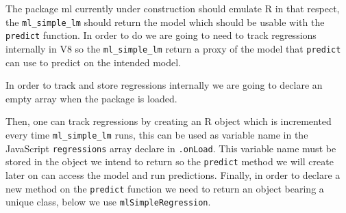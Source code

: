 \documentclass[
]{krantz}
\makeatletter
\newenvironment{Shaded}{\begin{snugshade}}{\end{snugshade}}
\newcommand{\CommentTok}[1]{\textcolor[rgb]{0.37,0.37,0.37}{\textit{#1}}}
\newcommand{\ControlFlowTok}[1]{\textcolor[rgb]{0.27,0.27,0.27}{\textbf{#1}}}
\newcommand{\DataTypeTok}[1]{\textcolor[rgb]{0.27,0.27,0.27}{#1}}
\newcommand{\KeywordTok}[1]{\textcolor[rgb]{0.27,0.27,0.27}{\textbf{#1}}}
\newcommand{\NormalTok}[1]{#1}
\newcommand{\OperatorTok}[1]{\textcolor[rgb]{0.43,0.43,0.43}{\textbf{#1}}}
\newcommand{\OtherTok}[1]{\textcolor[rgb]{0.37,0.37,0.37}{#1}}
\newcommand{\StringTok}[1]{\textcolor[rgb]{0.5,0.5,0.5}{#1}}
\newenvironment{kframe}{%
\medskip{}
\setlength{\fboxsep}{.8em}
 \def\at@end@of@kframe{}%
 \ifinner\ifhmode%
  \def\at@end@of@kframe{\end{minipage}}%
  \begin{minipage}{\columnwidth}%
 \fi\fi%
 \def\FrameCommand##1{\hskip\@totalleftmargin \hskip-\fboxsep
 \colorbox{shadecolor}{##1}\hskip-\fboxsep
     \hskip-\linewidth \hskip-\@totalleftmargin \hskip\columnwidth}%
 \MakeFramed {\advance\hsize-\width
   \@totalleftmargin\z@ \linewidth\hsize
   \@setminipage}}%
 {\par\unskip\endMakeFramed%
 \at@end@of@kframe}
\renewenvironment{Shaded}{\begin{kframe}}{\end{kframe}}
\makeatother
\begin{document}
The package ml currently under construction should emulate R in that respect, the \texttt{ml\_simple\_lm} should return the model which should be usable with the \texttt{predict} function. In order to do we are going to need to track regressions internally in V8 so the \texttt{ml\_simple\_lm} return a proxy of the model that \texttt{predict} can use to predict on the intended model.

In order to track and store regressions internally we are going to declare an empty array when the package is loaded.

\begin{Shaded}
\end{Shaded}

Then, one can track regressions by creating an R object which is incremented every time \texttt{ml\_simple\_lm} runs, this can be used as variable name in the JavaScript \texttt{regressions} array declare in \texttt{.onLoad}. This variable name must be stored in the object we intend to return so the \texttt{predict} method we will create later on can access the model and run predictions. Finally, in order to declare a new method on the \texttt{predict} function we need to return an object bearing a unique class, below we use \texttt{mlSimpleRegression}.
\end{document}
